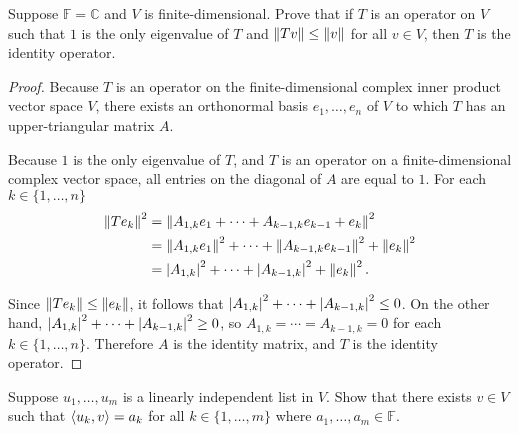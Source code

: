 \begin{exercise}
    Suppose $\mathbb{F} = \mathbb{C}$ and $V$ is finite-dimensional. Prove that if $T$ is an operator on $V$ such that $1$ is the only eigenvalue of $T$ and $\left\Vert{Tv}\right\Vert\leq \left\Vert{v}\right\Vert$ for all $v\in V$, then $T$ is the identity operator.
\end{exercise}

\begin{proof}
    Because $T$ is an operator on the finite-dimensional complex inner product vector space $V$, there exists an orthonormal basis $e_{1}, \ldots, e_{n}$ of $V$ to which $T$ has an upper-triangular matrix $A$.

    Because $1$ is the only eigenvalue of $T$, and $T$ is an operator on a finite-dimensional complex vector space, all entries on the diagonal of $A$ are equal to $1$. For each $k\in\{ 1,\ldots, n \}$
    \begin{align*}
        \left\Vert{Te_{k}}\right\Vert^{2} & = \left\Vert{A_{1,k}e_{1} + \cdots + A_{k-1,k}e_{k-1} + e_{k}}\right\Vert^{2}                       \\
                          & = \left\Vert{A_{1,k}e_{1}}\right\Vert^{2} + \cdots + \left\Vert{A_{k-1,k}e_{k-1}}\right\Vert^{2} + \left\Vert{e_{k}}\right\Vert^{2} \\
                          & = \left\vert{A_{1,k}}\right\vert^{2} + \cdots + \left\vert{A_{k-1,k}}\right\vert^{2} + \left\Vert{e_{k}}\right\Vert^{2}.
    \end{align*}

    Since $\left\Vert{Te_{k}}\right\Vert\leq \left\Vert{e_{k}}\right\Vert$, it follows that $\left\vert{A_{1,k}}\right\vert^{2} + \cdots + \left\vert{A_{k-1,k}}\right\vert^{2}\leq 0$. On the other hand, $\left\vert{A_{1,k}}\right\vert^{2} + \cdots + \left\vert{A_{k-1,k}}\right\vert^{2}\geq 0$, so $A_{1,k} = \cdots = A_{k-1,k} = 0$ for each $k\in\{ 1,\ldots, n \}$. Therefore $A$ is the identity matrix, and $T$ is the identity operator.
\end{proof}
\newpage

\begin{exercise}\label{chapter6:sectionB:exercise18}
    Suppose $u_{1}, \ldots, u_{m}$ is a linearly independent list in $V$. Show that there exists $v \in V$ such that $\left\langle{u_{k}, v}\right\rangle = a_{k}$ for all $k\in \{ 1, \ldots, m \}$ where $a_{1}, \ldots, a_{m}\in \mathbb{F}$.
\end{exercise}

